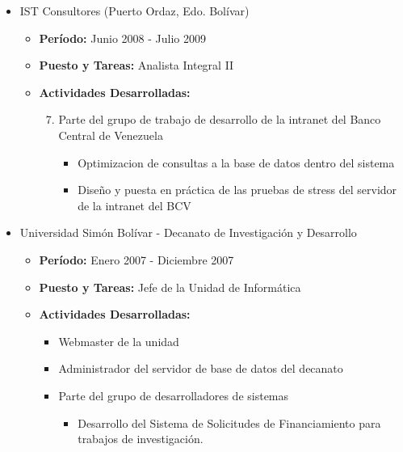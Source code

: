 \documentclass[letterpaper,12pt]{report}
\begin{document}
\begin{itemize}
        \item{IST Consultores (Puerto Ordaz, Edo. Bolívar)}
        \begin{itemize}
            \item{\textbf{Período:} Junio 2008 - Julio 2009}
            \item{\textbf{Puesto y Tareas:} Analista Integral II}
            \item{\textbf{Actividades Desarrolladas:}}
            \begin{enumerate}
                \setcounter{enumi}{6}
                \item Parte del grupo de trabajo de desarrollo de la intranet del Banco Central de Venezuela
            	    \begin{itemize}
	                    \item Optimizacion de consultas a la base de datos dentro del sistema
	                    \item Dise\~{n}o y puesta en práctica de las pruebas de stress del servidor de la intranet del BCV
	                \end{itemize}
            \end{enumerate}
        \end{itemize}    

        \item{Universidad Simón Bolívar - Decanato de Investigación y Desarrollo}
        \begin{itemize}
            \item{\textbf{Período:} Enero 2007 - Diciembre 2007}
            \item{\textbf{Puesto y Tareas:} Jefe de la Unidad de Informática}
            \item{\textbf{Actividades Desarrolladas:}}
            \begin{itemize}
                \item Webmaster de la unidad
                \item Administrador del servidor de base de datos del decanato
                \item Parte del grupo de desarrolladores de sistemas
                \begin{itemize}
            	    \item Desarrollo del Sistema de Solicitudes de Financiamiento para trabajos de investigación.
                \end{itemize}
            \end{itemize}
        \end{itemize}


\end{itemize}
\end{document}
